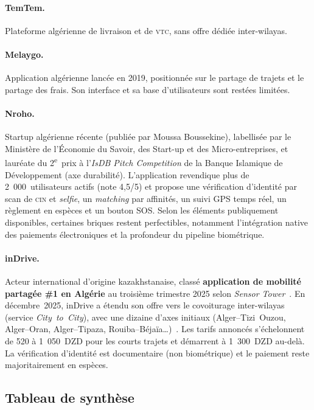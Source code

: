 \documentclass[12pt, a4paper, oneside]{report}
\begin{document}
\paragraph{TemTem.} Plateforme algérienne de livraison et de \textsc{vtc}, sans offre dédiée inter-wilayas.

\paragraph{Melaygo.} Application algérienne lancée en 2019, positionnée sur le partage de trajets et le partage des frais. Son interface et sa base d'utilisateurs sont restées limitées.

\paragraph{Nroho.} Startup algérienne récente (publiée par Moussa Boussekine), labellisée par le Ministère de l'Économie du Savoir, des Start-up et des Micro-entreprises, et lauréate du 2\textsuperscript{e}~prix à l'\textit{IsDB Pitch Competition} de la Banque Islamique de Développement (axe durabilité). L'application revendique plus de 2~000~utilisateurs actifs (note 4,5/5) et propose une vérification d'identité par scan de \textsc{cin} et \textit{selfie}, un \textit{matching} par affinités, un suivi GPS temps réel, un règlement en espèces et un bouton SOS. Selon les éléments publiquement disponibles, certaines briques restent perfectibles, notamment l'intégration native des paiements électroniques et la profondeur du pipeline biométrique.

\paragraph{inDrive.} Acteur international d'origine kazakhstanaise, classé \textbf{application de mobilité partagée \#1 en Algérie} au troisième trimestre 2025 selon \textit{Sensor Tower}~\cite{sensortower_algeria_2025}. En décembre~2025, inDrive a étendu son offre vers le covoiturage inter-wilayas (service \textit{City~to~City}), avec une dizaine d'axes initiaux (Alger--Tizi~Ouzou, Alger--Oran, Alger--Tipaza, Rouiba--Béjaïa\dots)~\cite{indrive_interwilaya_2025}. Les tarifs annoncés s'échelonnent de 520 à 1~050~DZD pour les courts trajets et démarrent à 1~300~DZD au-delà. La vérification d'identité est documentaire (non biométrique) et le paiement reste majoritairement en espèces.

\subsection{Tableau de synthèse}
\end{document}
